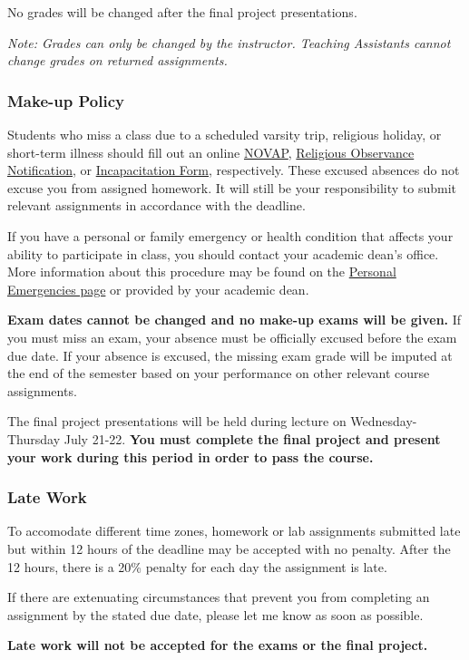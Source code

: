 \documentclass[]{article}
\begin{document}
No grades will be changed after the final project presentations.

\emph{Note: Grades can only be changed by the instructor. Teaching
Assistants cannot change grades on returned assignments.}

\hypertarget{make-up-policy}{%
\subsubsection{Make-up Policy}\label{make-up-policy}}

Students who miss a class due to a scheduled varsity trip, religious
holiday, or short-term illness should fill out an online
\href{https://trinity.duke.edu/undergraduate/academic-policies/athletic-varsity-participation}{NOVAP},
\href{https://trinity.duke.edu/undergraduate/academic-policies/religious-holidays}{Religious
Observance Notification}, or
\href{https://trinity.duke.edu/undergraduate/academic-policies/illness}{Incapacitation
Form}, respectively. These excused absences do not excuse you from
assigned homework. It will still be your responsibility to submit
relevant assignments in accordance with the deadline.

If you have a personal or family emergency or health condition that
affects your ability to participate in class, you should contact your
academic dean's office. More information about this procedure may be
found on the
\href{https://trinity.duke.edu/undergraduate/academic-policies/personal-emergencies}{Personal
Emergencies page} or provided by your academic dean.

\textbf{Exam dates cannot be changed and no make-up exams will be
given.} If you must miss an exam, your absence must be officially
excused before the exam due date. If your absence is excused, the
missing exam grade will be imputed at the end of the semester based on
your performance on other relevant course assignments.

The final project presentations will be held during lecture on
Wednesday-Thursday July 21-22. \textbf{You must complete the final
project and present your work during this period in order to pass the
course.}

\hypertarget{late-work}{%
\subsubsection{Late Work}\label{late-work}}

To accomodate different time zones, homework or lab assignments
submitted late but within 12 hours of the deadline may be accepted with
no penalty. After the 12 hours, there is a 20\% penalty for each day the
assignment is late.

If there are extenuating circumstances that prevent you from completing
an assignment by the stated due date, please let me know as soon as
possible.

\textbf{Late work will not be accepted for the exams or the final
project.}
\end{document}
